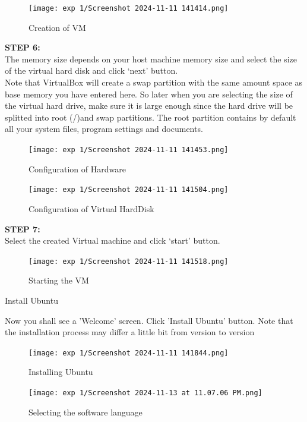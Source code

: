 \documentclass[12pt]{article}
\begin{document}
\begin{spacing}{1.5}
\begin{adjustwidth}{0cm}{0cm}
\begin{justify}
\begin{figure}[H]
    \centering
    \texttt{[image: exp 1/Screenshot 2024-11-11 141414.png]}
    \caption{Creation of VM}
    \label{fig: 1}
\end{figure}

\textbf{STEP 6:} \\
The memory size depends on your host machine memory size and select the size of the virtual hard disk and click ‘next’ button. \\
Note that VirtualBox will create a swap partition with the same amount space as base memory you have entered here. So later when you are selecting the size of the virtual hard drive, make sure it is large enough since the hard drive will be splitted into root (/)and swap partitions. The root partition contains by default all your system files, program settings and documents.

\begin{figure}[H]
    \centering
    \texttt{[image: exp 1/Screenshot 2024-11-11 141453.png]}
    \caption{Configuration of Hardware}
    \label{fig: 1}
\end{figure}

\begin{figure}[H]
    \centering
    \texttt{[image: exp 1/Screenshot 2024-11-11 141504.png]}
    \caption{Configuration of Virtual HardDisk}
    \label{fig: 1}
\end{figure}

\textbf{STEP 7:} \\
Select the created Virtual machine and click ‘start’ button.

\begin{figure}[H]
    \centering
    \texttt{[image: exp 1/Screenshot 2024-11-11 141518.png]}
    \caption{Starting the VM}
    \label{fig: 1}
\end{figure}

Install Ubuntu 

Now you shall see a 'Welcome' screen. Click 'Install Ubuntu' button. Note that the installation process may differ a little bit from version to version

\begin{figure}[H]
    \centering
    \texttt{[image: exp 1/Screenshot 2024-11-11 141844.png]}
    \caption{Installing Ubuntu}
    \label{fig: 1}
\end{figure}

\begin{figure}[H]
    \centering
    \texttt{[image: exp 1/Screenshot 2024-11-13 at 11.07.06 PM.png]}
    \caption{Selecting the software language}
    \label{fig: 1}
\end{figure}


\end{justify}
\end{adjustwidth}
\end{spacing}
\end{document}
